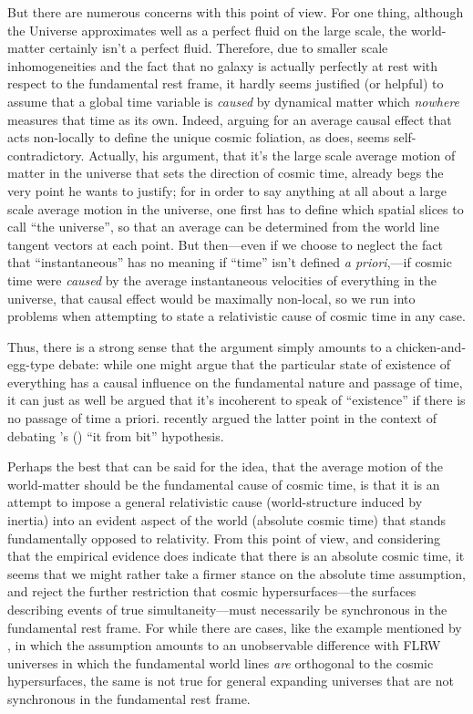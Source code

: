 \documentclass[12 pt]{article}
\def\citeapos#1{\citeauthor{#1}'s (\citeyear{#1})}
\begin{document}
But there are numerous concerns with this point of view. For one thing, although the Universe approximates well as a perfect fluid on the large scale, the world-matter certainly isn't a perfect fluid. Therefore, due to smaller scale inhomogeneities and the fact that no galaxy is actually perfectly at rest with respect to the fundamental rest frame, it hardly seems justified (or helpful) to assume that a global time variable is \textit{caused} by dynamical matter which \textit{nowhere} measures that time as its own. Indeed, arguing for an average causal effect that acts non-locally to define the unique cosmic foliation, as \citet{Ellis2013} does, seems self-contradictory. Actually, his argument, that it's the large scale average motion of matter in the universe that sets the direction of cosmic time, already begs the very point he wants to justify; for in order to say anything at all about a large scale average motion in the universe, one first has to define which spatial slices to call ``the universe'', so that an average can be determined from the world line tangent vectors at each point. But then---even if we choose to neglect the fact that ``instantaneous'' has no meaning if ``time'' isn't defined \textit{a priori},---if cosmic time were \textit{caused} by the average instantaneous velocities of everything in the universe, that causal effect would be maximally non-local, so we run into problems when attempting to state a relativistic cause of cosmic time in any case. 

Thus, there is a strong sense that the argument simply amounts to a chicken-and-egg-type debate: while one might argue that the particular state of existence of everything has a causal influence on the fundamental nature and passage of time, it can just as well be argued that it's incoherent to speak of ``existence'' if there is no passage of time a priori. \citet{Janzen2013} recently argued the latter point in the context of debating \citeapos{Wheeler1990} ``it from bit'' hypothesis. 

Perhaps the best that can be said for the idea, that the average motion of the world-matter should be the fundamental cause of cosmic time, is that it is an attempt to impose a general relativistic cause (world-structure induced by inertia) into an evident aspect of the world (absolute cosmic time) that stands fundamentally opposed to relativity. From this point of view, and considering that the empirical evidence does indicate that there is an absolute cosmic time, it seems that we might rather take a firmer stance on the absolute time assumption, and reject the further restriction that cosmic hypersurfaces---the surfaces describing events of true simultaneity---must necessarily be synchronous in the fundamental rest frame. For while there are cases, like the example mentioned by \citet{deSitter1917b}, in which the assumption amounts to an unobservable difference with FLRW universes in which the fundamental world lines \textit{are} orthogonal to the cosmic hypersurfaces, the same is not true for general expanding universes that are not synchronous in the fundamental rest frame. 
\end{document}
